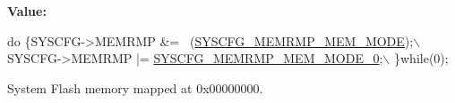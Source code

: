 {\bfseries Value\+:}
\begin{DoxyCode}
\textcolor{keywordflow}{do} \{SYSCFG->MEMRMP &= ~(\hyperlink{group___peripheral___registers___bits___definition_ga3c05039ec67573c00da29f58b914f258}{SYSCFG\_MEMRMP\_MEM\_MODE});\(\backslash\)
                                                         SYSCFG->MEMRMP |= 
      \hyperlink{group___peripheral___registers___bits___definition_ga30d5f406535f94faea2e7f924d50201b}{SYSCFG\_MEMRMP\_MEM\_MODE\_0};\(\backslash\)
                                                        \}\textcolor{keywordflow}{while}(0);
\end{DoxyCode}


System Flash memory mapped at 0x00000000. 


